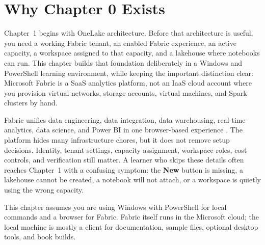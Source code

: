 \section{Why Chapter 0 Exists}
Chapter~1 begins with OneLake architecture. Before that architecture is useful, you need a working Fabric tenant, an enabled Fabric experience, an active capacity, a workspace assigned to that capacity, and a lakehouse where notebooks can run. This chapter builds that foundation deliberately in a Windows and PowerShell learning environment, while keeping the important distinction clear: Microsoft Fabric is a SaaS analytics platform, not an IaaS cloud account where you provision virtual networks, storage accounts, virtual machines, and Spark clusters by hand.

Fabric unifies data engineering, data integration, data warehousing, real-time analytics, data science, and Power BI in one browser-based experience \cite{microsoftFabricOverview}. The platform hides many infrastructure chores, but it does not remove setup decisions. Identity, tenant settings, capacity assignment, workspace roles, cost controls, and verification still matter. A learner who skips these details often reaches Chapter~1 with a confusing symptom: the \textbf{New} button is missing, a lakehouse cannot be created, a notebook will not attach, or a workspace is quietly using the wrong capacity.

\begin{notebox}
This chapter assumes you are using Windows with PowerShell for local commands and a browser for Fabric. Fabric itself runs in the Microsoft cloud; the local machine is mostly a client for documentation, sample files, optional desktop tools, and book builds.
\end{notebox}

